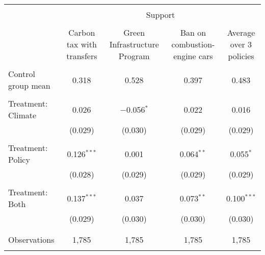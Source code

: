 
\begin{tabular}{@{\extracolsep{5pt}}lcccc} 
\\[-1.8ex]\hline 
\hline \\[-1.8ex] 
 & \multicolumn{4}{c}{Support} \\ 
\cline{2-5} 
\\[-1.8ex] & Carbon tax with transfers & Green Infrastructure Program & Ban on combustion-engine cars & Average over 3 policies \\ 
\hline \\[-1.8ex] 
 Control group mean & 0.318 & 0.528 & 0.397 & 0.483  \\ \hline \\[-1.8ex] Treatment: Climate & 0.026 & $-$0.056$^{*}$ & 0.022 & 0.016 \\ 
  & (0.029) & (0.030) & (0.029) & (0.029) \\ 
  & & & & \\ 
 Treatment: Policy & 0.126$^{***}$ & 0.001 & 0.064$^{**}$ & 0.055$^{*}$ \\ 
  & (0.028) & (0.029) & (0.029) & (0.029) \\ 
  & & & & \\ 
 Treatment: Both & 0.137$^{***}$ & 0.037 & 0.073$^{**}$ & 0.100$^{***}$ \\ 
  & (0.029) & (0.030) & (0.030) & (0.030) \\ 
  & & & & \\ 
\hline \\[-1.8ex] 

Observations & 1,785 & 1,785 & 1,785 & 1,785 \\ 
\hline 
\hline \\[-1.8ex] 
\end{tabular} 